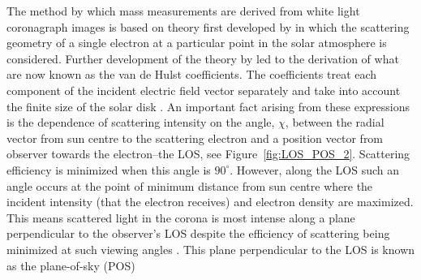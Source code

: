 The method by which mass measurements are derived from white light coronagraph images is based on theory first developed by \citet{min30} in 
which the scattering geometry of a single electron at a particular point in the solar atmosphere is considered. Further development of the theory by 
\citet{vdeh50} led to the derivation of what are now known as the van de Hulst coefficients. The coefficients treat each component of the incident 
electric field vector separately and take into account the finite size of the solar disk \citep{min30, 
bil66, how09}. An important fact arising from these expressions is the dependence of scattering intensity on the angle, $\chi$, between the radial 
vector from sun centre to the scattering electron and a position vector from observer towards the electron--the LOS, see Figure~\ref{fig:LOS_POS_2}. 
Scattering efficiency is minimized when this angle is $90^{\circ}$. However, along the LOS such an angle occurs at the point of minimum distance 
from sun centre where the incident intensity (that the electron receives) and electron density are maximized. This means scattered light in the 
corona is most intense along a plane 
perpendicular to the observer's LOS despite the efficiency of scattering being minimized at such viewing angles \citep{how09}. This plane 
perpendicular to the LOS is known as the plane-of-sky (POS)
